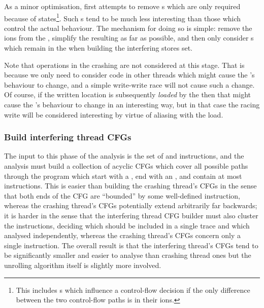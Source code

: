 As a minor optimisation, {\implementation} first attempts to remove
s which are only required because of 
states\footnote{This includes s which influence a
  {\StateMachine} control-flow decision if the only difference between
  the two control-flow paths is in their ions.}.  Such
s tend to be much less interesting than those which
control the {\StateMachines} actual behaviour.  The mechanism for
doing so is simple: remove the ions from the
{\StateMachine}, simplify the resulting {\StateMachine} as far as
possible, and then only consider s which remain in the
{\StateMachine} when building the interfering stores set.

Note that  operations in the crashing {\StateMachine} are
not considered at this stage.  That is because we only need to
consider code in other threads which might cause the 's behaviour to change, and a simple write-write race will
not cause such a change.  Of course, if the written location is
subsequently \emph{loaded} by the  then that
might cause the 's behaviour to change in an
interesting way, but in that case the racing write will be considered
interesting by virtue of aliasing with the load.

\subsubsection{Build interfering thread CFGs}

The input to this phase of the analysis is the set of
 and  instructions, and
the analysis must build a collection of acyclic CFGs which cover all
possible paths through the program which start with a
, end with an , and contain at most \backref{$\alpha$} instructions.  This
is easier than building the crashing thread's CFGs in the sense that
both ends of the CFG are ``bounded'' by some well-defined instruction,
whereas the crashing thread's CFGs potentially extend arbitrarily far
backwards; it is harder in the sense that the interfering thread CFG
builder must also cluster the instructions, deciding which should be
included in a single trace and which analysed independently, whereas
the crashing thread's CFGs concern only a single instruction.  The
overall result is that the interfering thread's CFGs tend to be
significantly smaller and easier to analyse than crashing thread ones
but the unrolling algorithm itself is slightly more involved.

